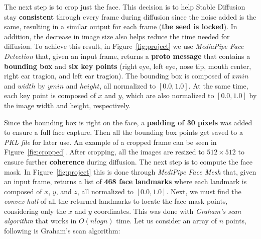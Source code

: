 \documentclass[preprint]{elsarticle}
\begin{document}
The next step is to crop just the face.  This decision is to help Stable Diffusion stay \textbf{consistent} through every frame during diffusion since the noise added is the same,  resulting in a similar output for each frame (\textbf{the seed is locked}).  In addition, the decrease in image size also helps reduce the time needed for diffusion. 
To achieve this result, in Figure~\ref{fig:project} we use \emph{MediaPipe Face Detection} that, given an input frame,  returns a \textbf{proto message} that contains a \textbf{bounding box} and \textbf{six key points} (right eye, left eye, nose tip, mouth center, right ear tragion, and left ear tragion). 
The bounding box is composed of $xmin$ and $width$ by $ymin$ and $height$, all normalized to $[0.0, 1.0]$. 
At the same time, each key point is composed of $x$ and $y$, which are also normalized to $[0.0, 1.0]$ by the image width and height, respectively. 

\FloatBarrier

Since the bounding box is right on the face, a \textbf{padding of 30 pixels} was added to ensure a full face capture. Then all the bounding box points get saved to a \emph{PKL file} for later use.  An example of a cropped frame can be seen in Figure~\ref{fig:cropped}. After cropping, all the images are resized to $512 \times 512$ to ensure further \textbf{coherence} during diffusion.  The next step is to compute the face mask.  In Figure~\ref{fig:project} this is done through \emph{MediPipe Face Mesh} that, given an input frame, returns a list of \textbf{468 face landmarks}  where each landmark is composed of $x$, $y$, and $z$, all normalized to  $[0.0, 1.0]$.  Next, we must find the \emph{convex hull} of all the returned landmarks to locate the face mask points, considering only the $x$ and $y$ coordinates. 
This was done with \emph{Graham's scan algorithm} \cite{GRAHAM1972132} that works in $O(n log n)$ time. Let us consider an array of $n$ points, following is Graham's scan algorithm:
\end{document}
